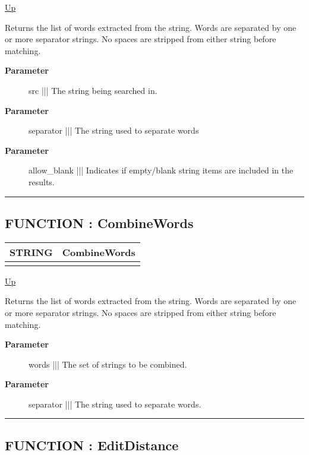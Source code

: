 \hyperlink{ecldoc:Str}{Up}

\par
Returns the list of words extracted from the string. Words are separated by one or more separator strings. No spaces are stripped from either string before matching.

\par
\begin{description}
\item [\textbf{Parameter}] src ||| The string being searched in.
\item [\textbf{Parameter}] separator ||| The string used to separate words
\item [\textbf{Parameter}] allow\_blank ||| Indicates if empty/blank string items are included in the results.
\end{description}

\rule{\textwidth}{0.4pt}
\subsection*{FUNCTION : CombineWords}
\hypertarget{ecldoc:str.combinewords}{}

{\renewcommand{\arraystretch}{1.5}
\begin{tabularx}{\textwidth}{|>{\raggedright\arraybackslash}l|X|}
\hline
\hspace{0pt}STRING & CombineWords \\
\hline
\multicolumn{2}{|>{\raggedright\arraybackslash}X|}{\hspace{0pt}(SET OF STRING words, STRING separator)} \\
\hline
\end{tabularx}
}

\hyperlink{ecldoc:Str}{Up}

\par
Returns the list of words extracted from the string. Words are separated by one or more separator strings. No spaces are stripped from either string before matching.

\par
\begin{description}
\item [\textbf{Parameter}] words ||| The set of strings to be combined.
\item [\textbf{Parameter}] separator ||| The string used to separate words.
\end{description}

\rule{\textwidth}{0.4pt}
\subsection*{FUNCTION : EditDistance}
\hypertarget{ecldoc:str.editdistance}{}

